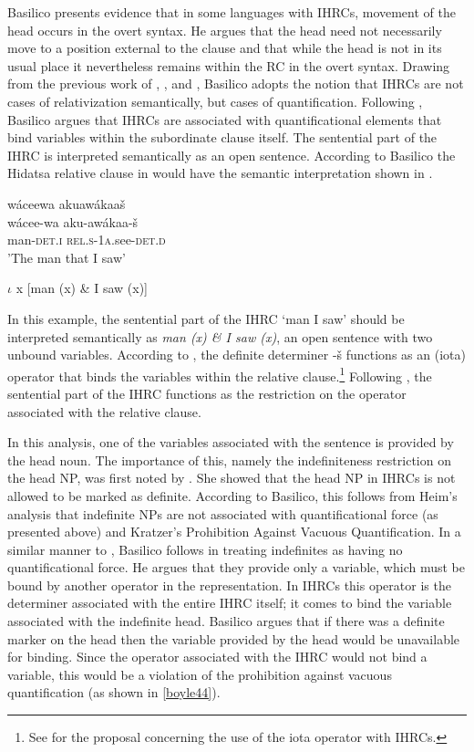 \documentclass[output=paper]{LSP/langsci}
\begin{document}
Basilico presents evidence that in some languages with IHRCs, movement of the head occurs in the overt syntax. He argues that the head need not necessarily move to a position external to the clause and that while the head is not in its usual place it nevertheless remains within the RC in the overt syntax. Drawing from the previous work of \citet{Williamson1987}, \citet{Jelinek1987}, and \citet{Culy1990}, Basilico adopts the notion that IHRCs are not cases of relativization semantically, but cases of quantification. Following \citet{Heim1982}, Basilico argues that IHRCs are associated with quantificational elements that bind variables within the subordinate clause itself. The sentential part of the IHRC is interpreted semantically as an open sentence. According to Basilico the Hidatsa relative clause in  would have the semantic interpretation shown in .

\ea \label{boyle42}
\glll w\'aceewa     akuaw\'akaa\v{s}\\
w\'acee-wa       aku-aw\'akaa-\v{s}\\
man-\textsc{det.i}  \textsc{rel.s-1a}.see-\textsc{det.d}\\
\trans 'The man that I saw'
\z

\ea \label{boyle43}
 $\iota$ x [man (x) \& I saw (x)]  
\z

In this example, the sentential part of the IHRC `man I saw' should be interpreted semantically as \textit{man (x) \& I saw (x)}, an open sentence with two unbound variables.  According to \citeauthor{Basilico1996}, the definite determiner -\v{s} functions as an (iota) operator that binds the variables within the relative clause.\footnote{See \citet{Jelinek1987} for the proposal concerning the use of the iota operator with IHRCs.} Following \citet{Culy1990}, the sentential part of the IHRC functions as the restriction on the operator associated with the relative clause.  

In this analysis, one of the variables associated with the sentence is provided by the head noun. The importance of this, namely the indefiniteness restriction on the head NP, was first noted by \citet{Williamson1987}. She showed that the head NP in IHRCs is not allowed to be marked as definite. According to Basilico, this follows from Heim's \citeyearpar{Heim1982} analysis that indefinite NPs are not associated with quantificational force (as presented above) and Kratzer's \citeyearpar{Kratzer1989} Prohibition Against Vacuous Quantification. In a similar manner to \citet{Culy1990}, Basilico follows \citet{Heim1982} in treating indefinites as having no quantificational force. He argues that they provide only a variable, which must be bound by another operator in the representation. In IHRCs this operator is the determiner associated with the entire IHRC itself; it comes to bind the variable associated with the indefinite head. Basilico argues that if there was a definite marker on the head then the variable provided by the head would be unavailable for binding. Since the operator associated with the IHRC would not bind a variable, this would be a violation of the prohibition against vacuous quantification (as shown in \ref{boyle44}).
\end{document}
